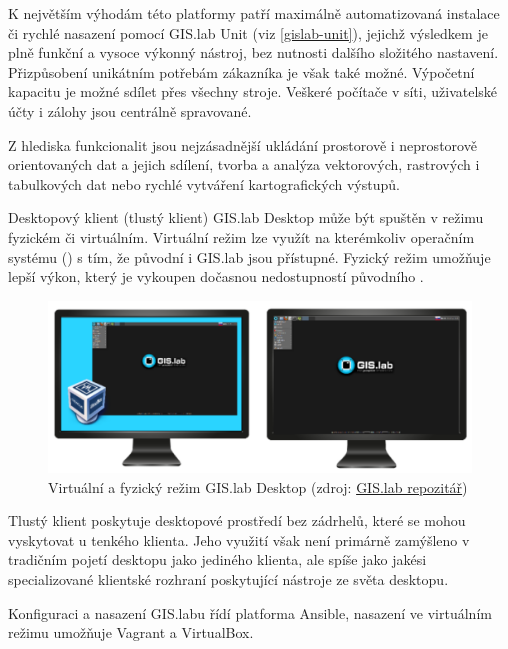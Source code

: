 K největším výhodám této platformy patří maximálně automatizovaná instalace či rychlé nasazení pomocí GIS.lab Unit (viz \ref{gislab-unit}), jejichž výsledkem je plně funkční a vysoce výkonný nástroj, bez nutnosti dalšího složitého nastavení. Přizpůsobení unikátním potřebám zákazníka je však také možné. Výpočetní kapacitu je možné sdílet přes všechny stroje. Veškeré počítače v síti, uživatelské účty i zálohy jsou centrálně spravované.

Z hlediska funkcionalit jsou nejzásadnější ukládání prostorově i neprostorově orientovaných dat a jejich sdílení, tvorba a analýza vektorových, rastrových i tabulkových dat nebo rychlé vytváření kartografických výstupů.

Desktopový klient (tlustý klient) GIS.lab Desktop může být spuštěn v režimu fyzickém či virtuálním. Virtuální režim lze využít na kterémkoliv operačním systému () s tím, že původní  i GIS.lab jsou přístupné. Fyzický režim umožňuje lepší výkon, který je vykoupen dočasnou nedostupností původního .

\begin{figure}[H] \centering
    \includegraphics[width=450pt]{./pictures/physical-or-virtual-mode.png}
    \caption[Virtuální a fyzický režim GIS.lab Desktop]{Virtuální a fyzický režim GIS.lab Desktop (zdroj:
	\href{https://github.com/gislab-npo/gislab-doc/blob/master/img/installation/physical-or-virtual-mode.png}{GIS.lab repozitář})}
	\label{fig:gislab-rezim}
\end{figure}

Tlustý klient poskytuje desktopové prostředí bez zádrhelů, které se mohou vyskytovat u tenkého klienta. Jeho využití však není primárně zamýšleno v tradičním pojetí desktopu jako jediného klienta, ale spíše jako jakési specializované klientské rozhraní poskytující nástroje ze světa desktopu.

Konfiguraci a nasazení GIS.labu řídí platforma Ansible, nasazení ve virtuálním režimu umožňuje Vagrant a VirtualBox.

